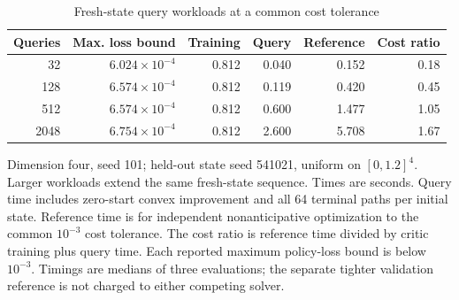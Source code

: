 \begin{table}[t]
\centering
\caption{Fresh-state query workloads at a common cost tolerance}
\label{tab:r5_workload}
\small
\begin{tabular}{rrrrrr}
\toprule
Queries & Max. loss bound & Training & Query & Reference & Cost ratio \\
\midrule
32 & $6.024\times10^{-4}$ & 0.812 & 0.040 & 0.152 & 0.18 \\
128 & $6.574\times10^{-4}$ & 0.812 & 0.119 & 0.420 & 0.45 \\
512 & $6.574\times10^{-4}$ & 0.812 & 0.600 & 1.477 & 1.05 \\
2048 & $6.754\times10^{-4}$ & 0.812 & 2.600 & 5.708 & 1.67 \\
\bottomrule
\end{tabular}
\par\medskip
\begin{minipage}{.97\linewidth}
\footnotesize Dimension four, seed 101; held-out state seed 541021, uniform on $[0,1.2]^4$. Larger workloads extend the same fresh-state sequence. Times are seconds. Query time includes zero-start convex improvement and all 64 terminal paths per initial state. Reference time is for independent nonanticipative optimization to the common $10^{-3}$ cost tolerance. The cost ratio is reference time divided by critic training plus query time. Each reported maximum policy-loss bound is below $10^{-3}$. Timings are medians of three evaluations; the separate tighter validation reference is not charged to either competing solver.
\end{minipage}
\end{table}
